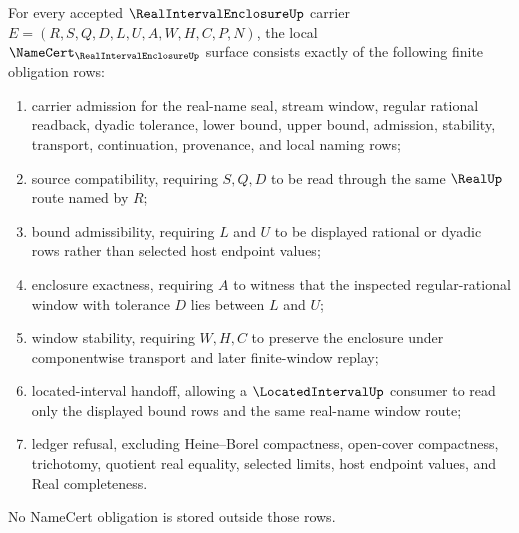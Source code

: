 \begin{theorem}
\label{thm:real-interval-enclosure-namecert-obligations}
For every accepted $\RealIntervalEnclosureUp$ carrier $E=(R,S,Q,D,L,U,A,W,H,C,P,N)$, the local $\NameCert_{\RealIntervalEnclosureUp}$ surface consists exactly of the following finite obligation rows:
\begin{enumerate}
\item carrier admission for the real-name seal, stream window, regular rational readback, dyadic tolerance, lower bound, upper bound, admission, stability, transport, continuation, provenance, and local naming rows;
\item source compatibility, requiring $S,Q,D$ to be read through the same $\RealUp$ route named by $R$;
\item bound admissibility, requiring $L$ and $U$ to be displayed rational or dyadic rows rather than selected host endpoint values;
\item enclosure exactness, requiring $A$ to witness that the inspected regular-rational window with tolerance $D$ lies between $L$ and $U$;
\item window stability, requiring $W,H,C$ to preserve the enclosure under componentwise transport and later finite-window replay;
\item located-interval handoff, allowing a $\LocatedIntervalUp$ consumer to read only the displayed bound rows and the same real-name window route;
\item ledger refusal, excluding Heine--Borel compactness, open-cover compactness, trichotomy, quotient real equality, selected limits, host endpoint values, and Real completeness.
\end{enumerate}
No NameCert obligation is stored outside those rows.
\end{theorem}
